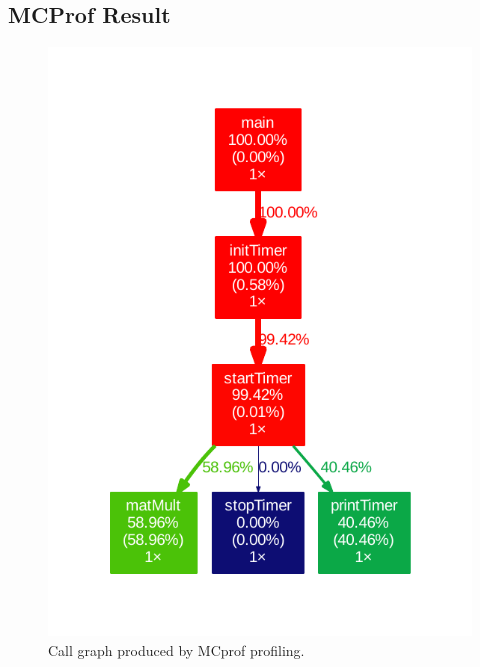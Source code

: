 \documentclass[final]{article} %
\begin{document}
\begin{appendices}

\section{MCProf Result}\label{app:appendix-mcprof-result}

\begin{figure}[H]
\centering
\includegraphics[scale=0.7]{resources/callgraphAll.pdf}
\caption{Call graph produced by MCprof profiling.}
\label{fig:callgraphall}
\end{figure}


\end{appendices}
\end{document}
